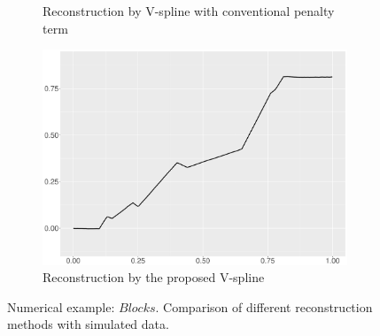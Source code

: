 \begin{figure}
\begin{subfigure}{0.45\textwidth}
    \caption{Reconstruction by V-spline with conventional penalty term}
    \end{subfigure}
    \begin{subfigure}{0.45\textwidth}
    \centering
    \includegraphics[width=\linewidth,height=0.45\textwidth]{Chapters/02TractorSplineTheory/plot/ggplot/ggBlocksTractor.pdf}
    \caption{Reconstruction by the proposed V-spline }
    \end{subfigure}
\caption{Numerical example: $\textit{Blocks}$. Comparison of different reconstruction methods with simulated data.}\label{num1}
 \end{figure}

